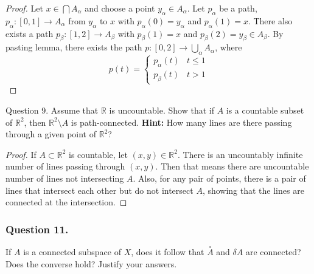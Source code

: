 \documentclass[12pt]{article}
\begin{document}
\begin{proof}
    Let $x \in \bigcap A_\alpha$ and choose a point 
    $y_\alpha \in A_\alpha$.
    Let $p_\alpha$ be a path, 
    $p_\alpha: [0, 1] \rightarrow A_\alpha$ from 
    $y_\alpha$ to $x$ with $p_\alpha(0) = y_\alpha$ and 
    $p_\alpha(1) = x$. There also exists a path 
    $p_\beta: [1, 2] \rightarrow A_\beta$ with 
    $p_\beta(1) = x$ and $p_\beta(2) = y_\beta \in A_\beta$.
    By pasting lemma, there exists the path 
    $p: [0, 2] \rightarrow \bigcup_{\alpha} A_\alpha$, where 
    $$p(t) = \begin{cases}
        p_\alpha(t) & t \leq 1\\
        p_\beta(t) & t > 1
    \end{cases}$$

\end{proof}

Question 9. Assume that $\mathbb{R}$ is uncountable. Show that if $A$ is a countable subset of 
$\mathbb{R}^2$, then $\mathbb{R}^2 \setminus A$ is path-connected. 
\textbf{Hint:} How many lines are there passing through a given point of $\mathbb{R}^2$? 

\begin{proof}
    If $A \subset \mathbb{R}^2$ is countable,
    let $(x, y) \in \mathbb{R}^2$. There is an uncountably infinite
    number of lines passing through $(x, y)$. Then that means
    there are uncountable number of lines not intersecting $A$.
    Also, for any pair of points, there is a pair of lines that intersect each other
    but do not intersect $A$, showing that the lines are connected at the intersection.
\end{proof}

\subsubsection*{Question 11.}
If $A$ is a connected subspace of $X$, does it follow that
$\overset{\circ}{A}$ and $\delta A$ are connected? 
Does the converse hold? Justify your answers.
\end{document}
